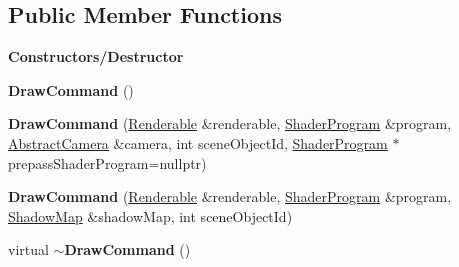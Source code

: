 \subsection*{Public Member Functions}
\begin{Indent}\textbf{ Constructors/\+Destructor}\par
\begin{DoxyCompactItemize}
\item 
\mbox{\label{classrev_1_1_draw_command_aa4c0b12ecfb72b3ba5d0db0b9ce191dc}} 
{\bfseries Draw\+Command} ()
\item 
\mbox{\label{classrev_1_1_draw_command_a19c16a6d0af276adb84188caef5343d6}} 
{\bfseries Draw\+Command} (\mbox{\hyperlink{classrev_1_1_renderable}{Renderable}} \&renderable, \mbox{\hyperlink{classrev_1_1_shader_program}{Shader\+Program}} \&program, \mbox{\hyperlink{classrev_1_1_abstract_camera}{Abstract\+Camera}} \&camera, int scene\+Object\+Id, \mbox{\hyperlink{classrev_1_1_shader_program}{Shader\+Program}} $\ast$prepass\+Shader\+Program=nullptr)
\item 
\mbox{\label{classrev_1_1_draw_command_a1b63e6631dc7ab7a55c0ae01006f9952}} 
{\bfseries Draw\+Command} (\mbox{\hyperlink{classrev_1_1_renderable}{Renderable}} \&renderable, \mbox{\hyperlink{classrev_1_1_shader_program}{Shader\+Program}} \&program, \mbox{\hyperlink{classrev_1_1_shadow_map}{Shadow\+Map}} \&shadow\+Map, int scene\+Object\+Id)
\item 
\mbox{\label{classrev_1_1_draw_command_aade51a00ff3703e561bcff8130df664f}} 
virtual {\bfseries $\sim$\+Draw\+Command} ()
\end{DoxyCompactItemize}
\end{Indent}
